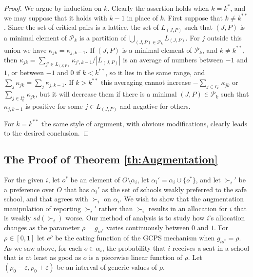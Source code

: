 \documentclass[12pt, A4paper]{article}
\theoremstyle{definition}
\newcommand{\cP}{\mathcal{P}}
\newcommand{\varep}{\varepsilon}
\begin{document}
\begin{appendix}
\begin{proof}
  We argue by induction on $k$.  Clearly the assertion holds when $k = k^*$, and we may suppose that it holds with $k - 1$ in place of $k$. First suppose that $k \ne k^{**}$. Since the set of critical pairs is a lattice, the set of $L_{(J,P)}$ such that $(J,P)$ is a minimal element of $\cP_k$ is a partition of $\bigcup_{(J,P) \in \cP_k} L_{(J,P)}$.  For $j$ outside this union we have $\kappa_{jk} = \kappa_{j,k-1}$.  If $(J,P)$ is a minimal element of $\cP_k$, and $k \ne k^{**}$, then $\kappa_{jk} = \sum_{j' \in L_{(J,P)}} \kappa_{j',k-1}/|L_{(J,P)}|$ is an average of numbers between $-1$ and $1$, or  between $-1$ and $0$ if $k < k^{**}$, so it lies in the same range, and $\sum_j \kappa_{jk} = \sum_j \kappa_{j,k-1}$. If $k > k^{**}$ this averaging cannot increase $-\sum_{j \in I^-_k} \kappa_{jk}$ or $\sum_{j \in I^+_k} \kappa_{jk}$, but it will decrease them if there is a minimal $(J,P) \in \cP_k$ such that $\kappa_{j,k-1}$ is positive for some $j \in L_{(J,P)}$ and negative for others.

  For $k = k^{**}$ the same style of argument, with obvious modifications, clearly leads to the desired conclusion.
\end{proof}

\subsection{The Proof of Theorem \ref{th:Augmentation}}

For the given $i$, let $o^*$ be an element of $O \setminus \alpha_i$, let $\alpha_i' = \alpha_i \cup \{o^*\}$, and let $\succ_i'$ be a preference over $O$ that has $\alpha_i'$ as the set of schools weakly preferred to the safe school, and that
agrees with $\succ_i$ on $\alpha_i$.  We wish to show that the augmentation manipulation of reporting $\succ_i'$ rather than $\succ_i$ results in an allocation for $i$ that is weakly $sd(\succ_i)$ worse. 
Our method of analysis is to study how $i$'s allocation changes as  the parameter $\rho = g_{io^*}$ varies continuously between $0$ and $1$.  For $\rho \in [0,1]$ let $e^\rho$ be the eating function of the GCPS mechanism when $g_{io^*} = \rho$.  As we saw above, for each $o \in \alpha_i$, the probability that $i$ receives a seat in a school that is at least as good as $o$ is a piecewise linear function of $\rho$. Let $(\rho_0 - \varep,\rho_0 + \varep)$ be an interval of generic values of $\rho$.  


\end{appendix}
\end{document}
